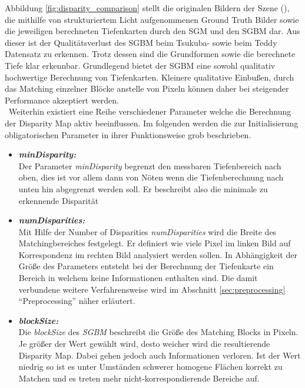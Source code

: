 \noindent
Abbildung \ref{fig:disparity_comparison} stellt die originalen Bildern der Szene (\cite{middlebury_data}), die mithilfe von strukturiertem Licht aufgenommenen Ground Truth Bilder sowie die jeweiligen berechneten Tiefenkarten durch den SGM und den SGBM dar. Aus dieser ist der Qualitätsverlust des SGBM beim Tsukuba- sowie beim Teddy Datensatz zu erkennen. Trotz dessen sind die Grundformen sowie die berechnete Tiefe klar erkennbar. Grundlegend bietet der SGBM eine sowohl qualitativ hochwertige Berechnung von Tiefenkarten. Kleinere qualitative Einbußen, durch das Matching einzelner Blöcke anstelle von Pixeln können daher bei steigender Performance akzeptiert werden.\\

\noindent\
Weiterhin existiert eine Reihe verschiedener Parameter welche die Berechnung der Disparity Map aktiv beeinflussen. Im folgenden werden die zur Initialisierung obligatorischen Parameter in ihrer Funktionsweise grob beschrieben.

\begin{itemize}
	\item \textbf{\emph{minDisparity:}}\\
	Der Parameter \emph{minDisparity} begrenzt den messbaren Tiefenbereich nach oben, dies ist vor allem dann von Nöten wenn die Tiefenberechnung nach unten hin abgegrenzt werden soll. Er beschreibt also die minimale zu erkennende Disparität
 	\item \textbf{\emph{numDisparities:}}\\
 	Mit Hilfe der Number of Disparities \emph{numDisparities} wird die Breite des Matchingbereiches festgelegt. Er definiert wie viele Pixel im linken Bild auf Korrespondenz im rechten Bild analysiert werden sollen. In Abhängigkeit der Größe des Parameters entsteht bei der Berechnung der Tiefenkarte ein Bereich in welchem keine Informationen enthalten sind. Die damit verbundene weitere Verfahrensweise wird im Abschnitt \ref{sec:preprocessing} \enquote{Preprocessing} näher erläutert.
	\item \textbf{\emph{blockSize:}}\\
	Die \emph{blockSize} des \emph{SGBM} beschreibt die Größe des Matching Blocks in Pixeln. Je größer der Wert gewählt wird, desto weicher wird die resultierende Disparity Map. Dabei gehen jedoch auch Informationen verloren. Ist der Wert niedrig so ist es unter Umständen schwerer homogene Flächen korrekt zu Matchen und es treten mehr nicht-korrespondierende Bereiche auf.
\end{itemize}


